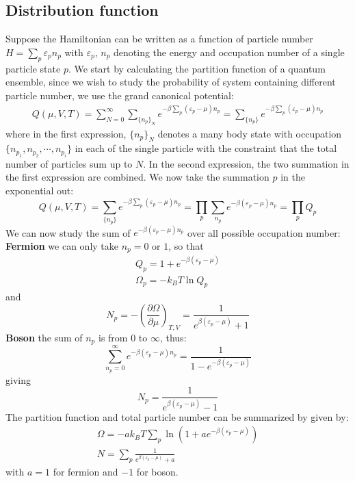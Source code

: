 \documentclass{article}
\begin{document}
\subsection{Distribution function}
Suppose the Hamiltonian can be written as a function of particle number
$H = \sum_p \varepsilon_p n_p$ with $\varepsilon_p$, $n_p$ denoting 
the energy and occupation number of a single particle state $p$.
We start by calculating the partition function of a quantum ensemble, since we wish 
to study the probability of system containing different particle number, we 
use the grand canonical potential:
\begin{align}
    Q(\mu,V,T) = \sum_{N=0}^{\infty} \sum_{\{n_p\}_N} e^{-\beta\sum_p (\varepsilon_p - \mu) n_p}
               = \sum_{\{n_p\}} e^{-\beta\sum_p (\varepsilon_p - \mu) n_p}
\end{align}
where in the first expression, $\{n_p\}_N$ denotes a many body state with occupation $\{n_{p_1},n_{p_2}, \cdots, n_{p_i}\}$
in each of the single particle with the constraint that the total number of particles sum up to $N$. In the second 
expression, the two summation in the first expression are combined.
We now take the summation $p$ in the exponential out:
\begin{equation}
    Q(\mu,V,T) = \sum_{\{n_p\}} e^{-\beta\sum_p (\varepsilon_p - \mu) n_p} = \prod_p \sum_{n_p} e^{-\beta(\varepsilon_p - \mu) n_p} = \prod_p Q_p
\end{equation}
We can now study the sum of $e^{-\beta(\varepsilon_p - \mu) n_p}$ over all possible occupation number:
\textbf{Fermion}
we can only take $n_p = 0$ or $1$, so that 
\begin{gather}
    Q_p = 1 + e^{-\beta(\varepsilon_p - \mu)} \\
    \Omega_p = -k_BT\ln Q_p
\end{gather}
and 
\begin{equation}
    N_p = -\left(\frac{\partial \Omega}{\partial \mu}\right)_{T,V} = \frac{1}{e^{\beta(\varepsilon_p - \mu)}+1}
\end{equation}
\textbf{Boson}
the sum of $n_p$ is from $0$ to $\infty$, thus:
\begin{equation}
    \sum_{n_p=0}^{\infty} e^{-\beta(\varepsilon_p - \mu) n_p} 
    =\frac{1}{1-e^{-\beta(\varepsilon_p - \mu)}} 
\end{equation}
giving
\begin{equation}
    N_p =  \frac{1}{e^{\beta(\varepsilon_p - \mu)}-1}
\end{equation}
The partition function and total particle number can be summarized by given by:
\begin{gather}
    \Omega = -ak_BT\sum_p\ln(1 + ae^{-\beta(\varepsilon_p - \mu)}) \\
    N = \sum_p \frac{1}{e^{\beta(\varepsilon_p - \mu)} + a}
\end{gather}
with $a = 1$ for fermion and $-1 $ for boson.
\end{document}
